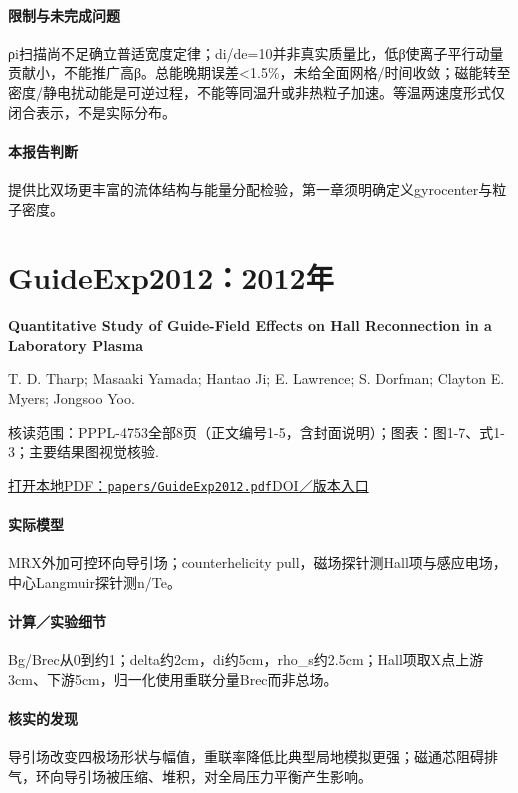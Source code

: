 \paragraph{限制与未完成问题}ρi扫描尚不足确立普适宽度定律；di/de=10并非真实质量比，低β使离子平行动量贡献小，不能推广高β。总能晚期误差<1.5\%，未给全面网格/时间收敛；磁能转至密度/静电扰动能是可逆过程，不能等同温升或非热粒子加速。等温两速度形式仅闭合表示，不是实际分布。

\paragraph{本报告判断}提供比双场更丰富的流体结构与能量分配检验，第一章须明确定义gyrocenter与粒子密度。

\section{GuideExp2012：2012年}\label{paper:GuideExp2012}

\textbf{Quantitative Study of Guide-Field Effects on Hall Reconnection in a Laboratory Plasma}\citep{GuideExp2012}\

T. D. Tharp;  Masaaki Yamada;  Hantao Ji;  E. Lawrence;  S. Dorfman;  Clayton E. Myers;  Jongsoo Yoo.

\textsf{核读范围：}PPPL-4753全部8页（正文编号1-5，含封面说明）；\textsf{图表：}图1-7、式1-3；主要结果图视觉核验.

\href{run:papers/GuideExp2012.pdf}{打开本地PDF：\texttt{papers/GuideExp2012.pdf}}\quad\href{https://doi.org/10.1103/physrevlett.109.165002}{DOI／版本入口}

\paragraph{实际模型}MRX外加可控环向导引场；counterhelicity pull，磁场探针测Hall项与感应电场，中心Langmuir探针测n/Te。

\paragraph{计算／实验细节}Bg/Brec从0到约1；delta约2cm，di约5cm，rho\_s约2.5cm；Hall项取X点上游3cm、下游5cm，归一化使用重联分量Brec而非总场。

\paragraph{核实的发现}导引场改变四极场形状与幅值，重联率降低比典型局地模拟更强；磁通芯阻碍排气，环向导引场被压缩、堆积，对全局压力平衡产生影响。

